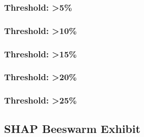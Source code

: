 \documentclass[11pt, letterpaper]{article}
\begin{document}
\clearpage
\subsubsection{Threshold: >5\%}




\clearpage
\subsubsection{Threshold: >10\%}




\clearpage
\subsubsection{Threshold: >15\%}




\clearpage
\subsubsection{Threshold: >20\%}




\clearpage
\subsubsection{Threshold: >25\%}




\clearpage
\subsection{SHAP Beeswarm Exhibit}
\label{app:exploratory_attribution}
\end{document}
